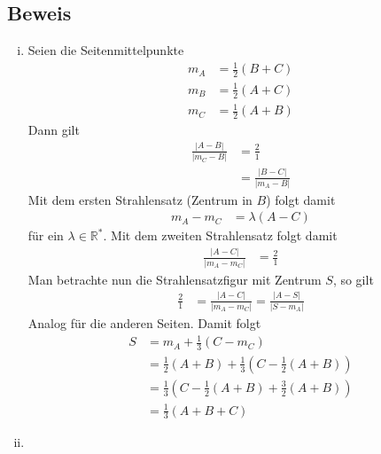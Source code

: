 \documentclass[11pt]{article}
\begin{document}
\subsection*{Beweis}
\begin{enumerate}[i)]
	\item Seien die Seitenmittelpunkte
	\begin{equation*}
	\begin{aligned}
	m_A &= \frac{1}{2} \left(B + C\right)\\
	m_B &= \frac{1}{2} \left(A + C\right)\\
	m_C &= \frac{1}{2} \left(A + B\right)
	\end{aligned}
	\end{equation*}
	Dann gilt
	\begin{equation*}
	\begin{aligned}
	\frac{\left|A - B\right|}{\left|m_C - B\right|} &= \frac{2}{1}\\
	&= \frac{\left|B - C\right|}{\left|m_A - B\right|}
	\end{aligned}
	\end{equation*}
	Mit dem ersten Strahlensatz (Zentrum in $ B $) folgt damit
	\begin{equation*}
	\begin{aligned}
	m_A - m_C &= \lambda\left(A - C\right)
	\end{aligned}
	\end{equation*}
	für ein $ \lambda \in \mathbb{R}^* $. Mit dem zweiten Strahlensatz folgt damit
	\begin{equation*}
	\begin{aligned}
	\frac{\left|A-C\right|}{\left|m_A - m_C\right|} &= \frac{2}{1}
	\end{aligned}
	\end{equation*}
	Man betrachte nun die Strahlensatzfigur mit Zentrum $ S $, so gilt
	\begin{equation*}
	\begin{aligned}
	\frac{2}{1} &= \frac{\left|A-C\right|}{\left|m_A - m_C\right|} = \frac{\left|A - S\right|}{\left|S - m_A\right|}
	\end{aligned}
	\end{equation*}
	Analog für die anderen Seiten. Damit folgt
	\begin{equation*}
	\begin{aligned}
	S &= m_A + \frac{1}{3} \left(C-m_C\right)\\
	&= \frac{1}{2} \left(A+B\right) + \frac{1}{3} \left(C - \frac{1}{2}\left(A + B\right)\right)\\
	&= \frac{1}{3} \left(C - \frac{1}{2}\left(A+B\right) + \frac{3}{2}\left(A+B\right)\right)\\
	&= \frac{1}{3} \left(A + B + C\right)
	\end{aligned}
	\end{equation*}
	\item 
\end{enumerate}
\end{document}

